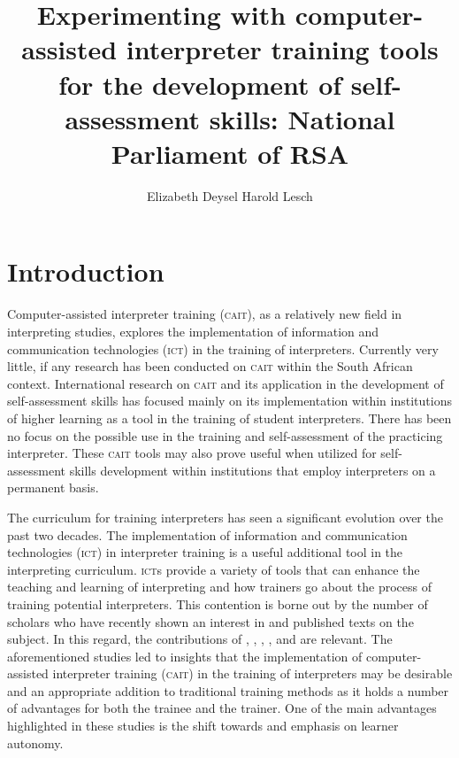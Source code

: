 \documentclass[output=paper]{langsci/langscibook}
\author{%
 Elizabeth Deysel\affiliation{National Parliament of South Africa}\lastand%
 Harold Lesch\affiliation{University of Stellenbosch}
}
\title{Experimenting with computer-assisted interpreter training tools for the development of self-assessment skills: National Parliament of RSA}
\begin{document}
\section{Introduction} 
Computer-assisted interpreter training (\textsc{cait}), as a relatively new field in interpreting studies, explores the implementation of information and communication technologies (\textsc{ict}) in the training of interpreters. Currently very little, if any research has been conducted on \textsc{cait} within the South African context. International research on \textsc{cait} and its application in the development of self-assessment skills has focused mainly on its implementation within institutions of higher learning as a tool in the training of student interpreters. There has been no focus on the possible use in the training and self-assessment of the practicing interpreter. These \textsc{cait} tools may also prove useful when utilized for self-assessment skills development within institutions that employ interpreters on a permanent basis.  

The curriculum for training interpreters has seen a significant evolution over the past two decades. The implementation of information and communication technologies (\textsc{ict}) in interpreter training is a useful additional tool in the interpreting curriculum. \textsc{ict}s provide a variety of tools that can enhance the teaching and learning of interpreting and how trainers go about the process of training potential interpreters. This contention is borne out by the number of scholars who have recently shown an interest in and published texts on the subject. In this regard, the contributions of \citet{Lim2014}, \citet{Pinazo2008}, \citet{Gorm2007}, \citet{Sandrelli2007b}, \citet{Lee2005} and \citet{Sandrelli2015, Sandrelli2007b, Sandrelli2002} are relevant. The aforementioned studies led to insights that the implementation of computer-assisted interpreter training (\textsc{cait}) in the training of interpreters may be desirable and an appropriate addition to traditional training methods as it holds a number of advantages for both the trainee and the trainer. One of the main advantages highlighted in these studies is the shift towards and emphasis on learner autonomy. 
\end{document}
